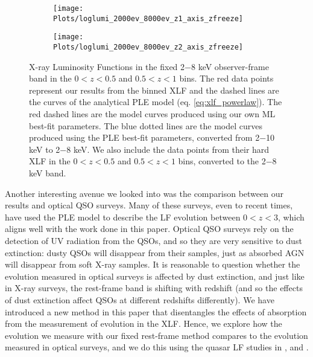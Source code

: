 \documentclass[fleqn,usenatbib]{mnras}
\begin{document}
    \begin{figure*}
    \centering
    	\begin{subfigure}{0.5\textwidth}
    		\centering
      		\texttt{[image: Plots/loglumi\_2000ev\_8000ev\_z1\_axis\_zfreeze]}
      		\label{fig:loglumi_2000ev_8000ev_z1_axis}
    	\end{subfigure}%
    	\begin{subfigure}{0.5\textwidth}
    		\centering
      		\texttt{[image: Plots/loglumi\_2000ev\_8000ev\_z2\_axis\_zfreeze]}
      		\label{fig:loglumi_2000ev_8000ev_z2_axis}
    	\end{subfigure}%
    \caption{X-ray Luminosity Functions in the fixed 2$-$8 keV observer-frame band in the $0 < z < 0.5$ and $0.5 < z < 1$ bins. The red data points represent our results from the binned XLF and the dashed lines are the curves of the analytical PLE model (eq. \ref{eq:xlf_powerlaw}). The red dashed lines are the model curves produced using our own ML best-fit parameters. The blue dotted lines are the model curves produced using the \protect\cite{ebrero2009xmm} PLE best-fit parameters, converted from 2$-$10 keV to 2$-$8 keV. We also include the data points from their hard XLF in the $0 < z < 0.5$ and $0.5 < z < 1$ bins, converted to the 2$-$8 keV band.}
    \label{fig:axisobfxlfs}
    \end{figure*}   
    
    Another interesting avenue we looked into was the comparison between our results and optical QSO surveys. 
    Many of these surveys, even to recent times, have used the PLE model to describe the LF evolution between $0 < z < 3$, which aligns well with the work done in this paper. 
    Optical QSO surveys rely on the detection of UV radiation from the QSOs, and so they are very sensitive to dust extinction: dusty QSOs will disappear from their samples, just as absorbed AGN will disappear from soft X-ray samples. 
    It is reasonable to question whether the evolution measured in optical surveys is affected by dust extinction, and just like in X-ray surveys, the rest-frame band is shifting with redshift (and so the effects of dust extinction affect QSOs at different redshifts differently). 
    We have introduced a new method in this paper that disentangles the effects of absorption from the measurement of evolution in the XLF. 
    Hence, we explore how the evolution we measure with our fixed rest-frame method compares to the evolution measured in optical surveys, and we do this using the quasar LF studies in \cite{ross2013quasarlf}, \cite{croom2004qso} and \cite{croom2009sdss}.
    
\end{document}
